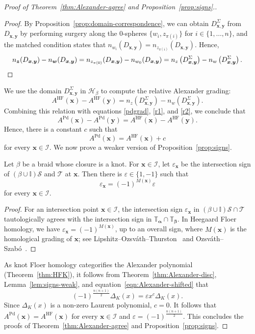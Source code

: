 \documentclass[11pt]{amsart}
\numberwithin{equation}{section}
\numberwithin{figure}{section}
\theoremstyle{definition}
\newcommand{\cI}{\mathcal{I}}
\newcommand{\cs}{\mathscr{S}}
\newcommand{\ct}{\mathscr{T}}
\newcommand{\bI}{\mathbb{I}}
\newcommand{\bT}{\mathbb{T}}
\DeclareMathOperator{\HF}{HF}
\DeclareMathOperator{\Pd}{Pd}
\newcommand{\as}{\boldsymbol{\alpha}}
\newcommand{\bs}{\boldsymbol{\beta}}
\newcommand{\ws}{\boldsymbol{w}}
\newcommand{\xs}{\boldsymbol{x}}
\newcommand{\ys}{\boldsymbol{y}}
\newcommand{\zs}{\boldsymbol{z}}
\begin{document}
\begin{proof}[Proof of Theorem~\ref{thm:Alexander-agree} and Proposition~\ref{prop:signs}.]
\begin{proof}
    By Proposition~\ref{prop:domain-correspondence}, we can obtain $D_{\xs,\ys}^\Sigma$ from $D_{\xs,\ys}$ by performing surgery along the 0-spheres $\{w_i,z_{\pi(i)}\}$ for $i \in \{1,\dots,n\}$, and the matched condition states that $n_{w_i}(D_{\xs,\ys}) = n_{z_{\pi(i)}}(D_{\xs,\ys})$. Hence,
    \[
    n_{\zs}(D_{\xs,\ys})-n_{\ws}(D_{\xs,\ys}) = n_{z_{\pi(0)}}(D_{\xs,\ys}) - n_{w_0}(D_{\xs,\ys}) = n_z\left(D^{\Sigma}_{\xs,\ys}\right)-n_w \left( D^{\Sigma}_{\xs,\ys} \right). \qedhere
    \]
\end{proof}

We use the domain $D^{\Sigma}_{\xs,\ys}$ in $\mathcal H_{\beta}$ to compute the relative Alexander grading:
\[
A^{\HF}(\xs)-A^{\HF}(\ys) = n_{z}(D^{\Sigma}_{\xs,\ys})-n_{w}(D^{\Sigma}_{\xs,\ys}).
\]
Combining this relation with equations \eqref{pdgrad}, \eqref{r1}, and \eqref{r2}, we conclude that
\begin{equation}
A^{\Pd}(\xs)-A^{\Pd}(\ys)=A^{\HF}(\xs)-A^{\HF}(\ys).
\end{equation}
Hence, there is a constant $c$ such that 
\begin{equation}\label{eqn:Alexander-shifted}
A^{\Pd}(\xs) = A^{\HF}(\xs) + c
\end{equation}
for every $\xs \in \cI$. We now prove a weaker version of Proposition~\ref{prop:signs}.

\begin{lem}\label{lem:signs-weak} 
Let $\beta$ be a braid whose closure is a knot. For $\xs \in \cI$, let $\varepsilon_{\xs}$ be the intersection sign of $(\beta \cup \bI)\cs$ and $\ct$ at $\xs$. Then there is $\varepsilon \in \{1,-1\}$ such that
\[
\varepsilon_{\xs} = (-1)^{M(\xs)} \varepsilon
\]
for every $\xs \in \cI$.
\end{lem}

\begin{proof}
    For an intersection point $\xs \in \cI$, the intersection sign $\varepsilon_{\xs}$ in $(\beta \cup \bI)\cs \cap \ct$ tautologically agrees with the intersection sign in $\bT_{\as} \cap \bT_{\bs}$. In Heegaard Floer homology, we have $\varepsilon_{\xs} = (-1)^{M(\xs)}$, up to an overall sign, where $M(\xs)$ is the homological grading of $\xs$; see Lipshitz--Ozsv\'ath--Thurston~\cite[Section~4.1]{bordered-notes} and Ozsv\'ath--Szab\'o~\cite[Section~1.2]{HF-lectures}.
\end{proof}

As knot Floer homology categorifies the Alexander polynomial (Theorem~\ref{thm:HFK}), it follows from Theorem~\ref{thm:Alexander-disc}, Lemma~\ref{lem:signs-weak}, and equation~\eqref{eqn:Alexander-shifted} that 
\[
(-1)^{\frac{n(n+1)}{2}}\Delta_K(x) = \varepsilon x^c \Delta_K(x).
\]
Since $\Delta_K(x)$ is a non-zero Laurent polynomial, $c = 0$. It follows that $A^{\Pd}(\xs) = A^{\HF}(\xs)$ for every $\xs \in \cI$ and $\varepsilon = (-1)^{\frac{n(n+1)}{2}}$. This concludes the proofs of Theorem~\ref{thm:Alexander-agree} and Proposition~\ref{prop:signs}.
\end{proof}
 
\end{document}
